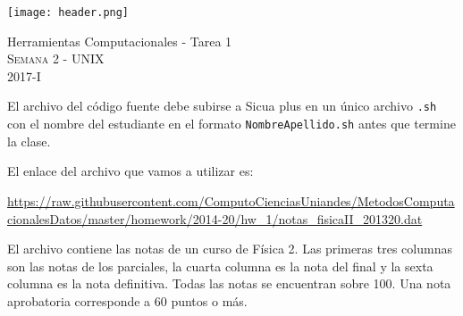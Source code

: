 \documentclass[11pt,letterpaper]{exam}
\begin{document}
\begin{center}

\texttt{[image: header.png]}

\vspace{1.0cm}
{\Large Herramientas Computacionales - Tarea 1} \\
\textsc{Semana 2 - UNIX}\\
2017-I\\
\end{center}



\vspace{0.5cm}

\noindent
El archivo del c\'odigo fuente debe subirse a Sicua plus en un \'unico archivo \verb'.sh' con el nombre del estudiante en el formato \verb"NombreApellido.sh" antes que termine la clase.

El enlace del archivo que vamos a utilizar es:

\url{https://raw.githubusercontent.com/ComputoCienciasUniandes/MetodosComputacionalesDatos/master/homework/2014-20/hw_1/notas_fisicaII_201320.dat}

El archivo contiene las notas de un curso de F\'isica 2. Las primeras tres columnas son las notas de los parciales, la cuarta columna es la nota del final y la sexta columna es la nota definitiva. Todas las notas se encuentran sobre 100. Una nota aprobatoria corresponde a 60 puntos o m\'as.

\vspace{0.5cm}
\end{document}
